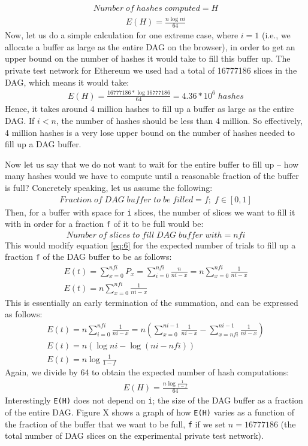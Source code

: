 \documentclass[10pt, conference, compsocconf]{IEEEtran}
\begin{document}
\begin{gather}
    Number\;of\;hashes\;computed = H
\end{gather}
\begin{gather}
  E(H) = \frac{n\log{ni}}{64}
\end{gather}
Now, let us do a simple calculation for one extreme case, where $i = 1$ (i.e., we allocate a buffer as large as the entire DAG on the browser), in order to get an upper bound on the number of hashes it would take to fill this buffer up. The private test network for Ethereum we used had a total of 16777186 slices in the DAG, which means it would take:
\begin{gather}
  E(H) = \frac{16777186*\log{16777186}}{64} = 4.36*10^6\;hashes
\end{gather}
Hence, it takes around 4 million hashes to fill up a buffer as large as the entire DAG. If $i < n$, the number of hashes should be less than 4 million. So effectively, 4 million hashes is a very lose upper bound on the number of hashes needed to fill up a DAG buffer.

Now let us say that we do not want to wait for the entire buffer to fill up -- how many hashes would we have to compute until a reasonable fraction of the buffer is full? Concretely speaking, let us assume the following:
\begin{gather}
  Fraction\;of\;DAG\;buffer\;to\;be\;filled = f;\;f \in [0,1]
\end{gather}
Then, for a buffer with space for \verb|i| slices, the number of slices we want to fill it with in order for a fraction \verb|f| of it to be full would be: 
\begin{gather}
  Number\;of\;slices\;to\;fill\;DAG\;buffer\;with = nfi
\end{gather}
This would modify equation \ref{eq:6} for the expected number of trials to fill up a fraction \verb|f| of the DAG buffer to be as follows:
\begin{gather}
    E(t) = \sum_{x=0}^{nfi}P_x = \sum_{i=0}^{nfi}\frac{n}{ni-x} = n\sum_{x=0}^{nfi}\frac{1}{ni-x}\\
    E(t) = n\sum_{x=0}^{nfi}\frac{1}{ni-x}
\end{gather}
This is essentially an early termination of the summation, and can be expressed as follows:
\begin{gather}
    E(t) = n\sum_{i=0}^{nfi}\frac{1}{ni-x} = n(\sum_{x=0}^{ni-1}\frac{1}{ni-x} - \sum_{x=nfi}^{ni-1}\frac{1}{ni-x})\\
    E(t) = n(\log{ni} - \log{(ni-nfi)}) \\
    E(t) = n\log{\frac{1}{1-f}}
\end{gather}
Again, we divide by 64 to obtain the expected number of hash computations:
\begin{gather}
    E(H) = \frac{n\log{\frac{1}{1-f}}}{64}
\end{gather}
Interestingly \verb|E(H)| does not depend on \verb|i|; the size of the DAG buffer as a fraction of the entire DAG. Figure X shows a graph of how \verb|E(H)| varies as a function of the fraction of the buffer that we want to be full, \verb|f| if we set $n = 16777186$ (the total number of DAG slices on the experimental private test network). 
\end{document}
